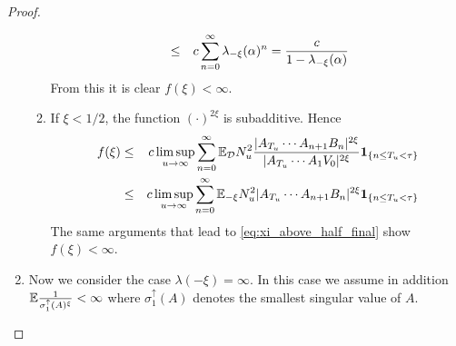 \documentclass{article}
\begin{document}
\begin{proof}
\begin{enumerate}
\begin{enumerate}
\begin{eqnarray*}
        &\leq& c \sum_{n=0}^{\infty} \lambda_{-\xi}(\alpha)^n
        = {c \over 1 - \lambda_{-\xi}(\alpha)}
      \end{eqnarray*}
      From this it is clear $f(\xi) < \infty$.
      \item If $\xi < 1/2$, the function $(\cdot)^{2\xi}$ is
        subadditive. Hence
        \begin{eqnarray*}
          f(\xi) &\leq& c \limsup_{u \to \infty}
          \sum_{n=0}^\infty \mathbb{E}_{\mathcal D} N_u^2
          {|A_{T_u} \cdots A_{n+1}B_n|^{2\xi}
            \over
            |A_{T_u} \cdots A_1 V_0|^{2\xi}
          }
          \mathbf{1}_{\{n \leq T_u < \tau\}} \\
          &\leq& c \limsup_{u \to \infty}
          \sum_{n=0}^{\infty}
            \mathbb{E}_{-\xi} N_u^2 
            |A_{T_u} \cdots A_{n+1} B_n|^{2\xi}
            \mathbf{1}_{\{n \leq T_u < \tau\}}
        \end{eqnarray*}
        The same arguments that lead to \eqref{eq:xi_above_half_final}
        show $f(\xi) < \infty$.
    \end{enumerate}
  \item Now we consider the case $\lambda(-\xi) = \infty$. In this
    case we assume in addition $\mathbb{E} {1 \over \sigma^{\uparrow}_1(A)^\xi}
    < \infty$ where $\sigma^{\uparrow}_1(A)$ denotes the smallest
    singular value of $A$.
    

\end{enumerate}
\end{proof}
\end{document}
